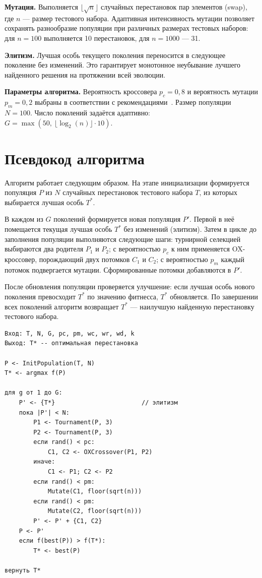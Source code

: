 \textbf{Мутация.} Выполняется $\lfloor\sqrt{n}\rfloor$ случайных перестановок пар элементов (swap), 
где $n$ --- размер тестового набора. Адаптивная интенсивность мутации позволяет сохранять разнообразие популяции 
при различных размерах тестовых наборов: для $n = 100$ выполняется 10 перестановок, для $n = 1000$ --- 31.

\textbf{Элитизм.} Лучшая особь текущего поколения переносится в следующее поколение без изменений. 
Это гарантирует монотонное неубывание лучшего найденного решения на протяжении всей эволюции.

\textbf{Параметры алгоритма.} Вероятность кроссовера $p_c = 0{,}8$ и вероятность мутации 
$p_m = 0{,}2$ выбраны в соответствии с рекомендациями~\cite{paygude2020}. Размер популяции $N = 100$. 
Число поколений задаётся адаптивно: 
$G = \max(50,\ \lfloor\log_2(n)\rfloor \cdot 10)$.

\section{Псевдокод алгоритма} \label{ch3:sec3}
Алгоритм работает следующим образом. На этапе инициализации формируется популяция $P$ из $N$ 
случайных перестановок тестового набора $T$, из которых выбирается лучшая особь $T^*$.

В каждом из $G$ поколений формируется новая популяция $P'$. Первой в неё помещается текущая лучшая 
особь $T^*$ без изменений (элитизм). Затем в цикле до заполнения популяции выполняются следующие шаги: 
турнирной селекцией выбираются два родителя $P_1$ и $P_2$; с вероятностью $p_c$ к ним применяется 
OX-кроссовер, порождающий двух потомков $C_1$ и $C_2$; с вероятностью $p_m$ каждый потомок подвергается 
мутации. Сформированные потомки добавляются в $P'$.

После обновления популяции проверяется улучшение: если лучшая особь нового поколения превосходит 
$T^*$ по значению фитнесса, $T^*$ обновляется. По завершении всех поколений алгоритм возвращает 
$T^*$ --- наилучшую найденную перестановку тестового набора.

\begin{lstlisting}[caption={Псевдокод алгоритма GA-FP+Div}, 
                   label={lst:ga}]
Вход: T, N, G, pc, pm, wc, wr, wd, k
Выход: T* -- оптимальная перестановка

P <- InitPopulation(T, N)
T* <- argmax f(P)

для g от 1 до G:
    P' <- {T*}                        // элитизм
    пока |P'| < N:
        P1 <- Tournament(P, 3)
        P2 <- Tournament(P, 3)
        если rand() < pc:
            C1, C2 <- OXCrossover(P1, P2)
        иначе:
            C1 <- P1; C2 <- P2
        если rand() < pm:
            Mutate(C1, floor(sqrt(n)))
        если rand() < pm:
            Mutate(C2, floor(sqrt(n)))
        P' <- P' + {C1, C2}
    P <- P'
    если f(best(P)) > f(T*):
        T* <- best(P)

вернуть T*
\end{lstlisting}